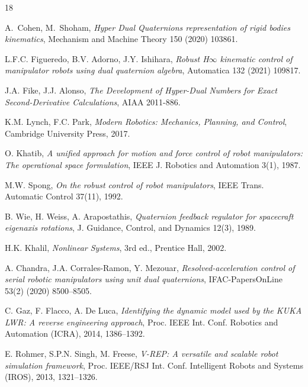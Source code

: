 \documentclass[11pt,a4paper]{article}
\begin{document}
\begin{thebibliography}{18}
\raggedright

A.~Cohen, M.~Shoham, \emph{Hyper Dual Quaternions representation of rigid bodies kinematics},
Mechanism and Machine Theory 150 (2020) 103861.

L.F.C. Figueredo, B.V. Adorno, J.Y. Ishihara, \emph{Robust H$\infty$ kinematic control of manipulator robots using dual quaternion algebra},
Automatica 132 (2021) 109817.

J.A. Fike, J.J. Alonso, \emph{The Development of Hyper-Dual Numbers for Exact Second-Derivative Calculations}, AIAA 2011-886.

K.M. Lynch, F.C. Park, \emph{Modern Robotics: Mechanics, Planning, and Control}, Cambridge University Press, 2017.

O. Khatib, \emph{A unified approach for motion and force control of robot manipulators: The operational space formulation},
IEEE J. Robotics and Automation 3(1), 1987.

M.W. Spong, \emph{On the robust control of robot manipulators},
IEEE Trans. Automatic Control 37(11), 1992.

B. Wie, H. Weiss, A. Arapostathis, \emph{Quaternion feedback regulator for spacecraft eigenaxis rotations},
J. Guidance, Control, and Dynamics 12(3), 1989.

H.K. Khalil, \emph{Nonlinear Systems}, 3rd ed., Prentice Hall, 2002.

A. Chandra, J.A. Corrales-Ramon, Y. Mezouar, \emph{Resolved-acceleration control of serial robotic manipulators using unit dual quaternions},
IFAC-PapersOnLine 53(2) (2020) 8500--8505.

C. Gaz, F. Flacco, A. De Luca, \emph{Identifying the dynamic model used by the KUKA LWR: A reverse engineering approach},
Proc. IEEE Int. Conf. Robotics and Automation (ICRA), 2014, 1386--1392.

E. Rohmer, S.P.N. Singh, M. Freese, \emph{V-REP: A versatile and scalable robot simulation framework},
Proc. IEEE/RSJ Int. Conf. Intelligent Robots and Systems (IROS), 2013, 1321--1326.


\end{thebibliography}
\end{document}
